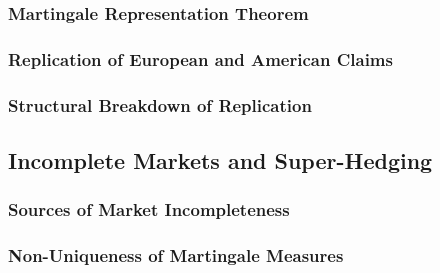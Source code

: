 \subsubsection{Martingale Representation Theorem}

%


\subsubsection{Replication of European and American Claims}

%


\subsubsection{Structural Breakdown of Replication}

%



\subsection{Incomplete Markets and Super-Hedging}
\label{subsec:incomplete_markets}

\subsubsection{Sources of Market Incompleteness}

%


\subsubsection{Non-Uniqueness of Martingale Measures}

